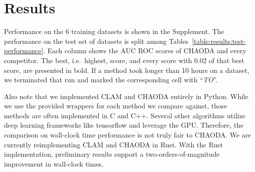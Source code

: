 \section{Results}
\label{sec:results}

Performance on the 6 training datasets is shown in the Supplement.
The performance on the test set of datasets is split among Tables~\ref{table:results:test-performance}.
Each column shows the AUC ROC scores of CHAODA and every competitor.
The best, i.e.\ highest, score, and every score with 0.02 of that best score, are presented in bold.
If a method took longer than 10 hours on a dataset, we terminated that run and marked the corresponding cell with ``\textit{TO}''.

Also note that we implemented CLAM and CHAODA entirely in Python.
While we use the provided wrappers for each method we compare against, those methods are often implemented in C and C++.
Several other algorithms utilize deep learning frameworks like tensorflow and leverage the GPU.
Therefore, the comparison on wall-clock time performance is not truly fair to CHAODA.
We are currently reimplementing CLAM and CHAODA in Rust.
With the Rust implementation, preliminary results support a two-orders-of-magnitude improvement in wall-clock times.








